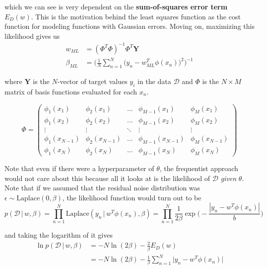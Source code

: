   which we can see is very dependent on the \textbf{sum-of-squares error term} $E_D(w)$. This is the motivation behind the least squares function as the cost function for modeling functions with Gaussian errors. Moving on, maximizing this likelihood gives us
  \begin{align*}
    w_{ML} & = (\Phi^T \Phi)^{-1} \Phi^T \mathbf{Y} \\
    \beta_{ML} & = \Bigg( \frac{1}{N} \sum_{n=1}^N \big( y_n - w_{ML}^T \phi(x_n)\big)^2 \Bigg)^{-1}
  \end{align*}

  where $\mathbf{Y}$ is the $N$-vector of target values $y_i$ in the data $\mathcal{D}$ and $\Phi$ is the $N \times M$ matrix of basis functions evaluated for each $x_n$.

  \begin{equation}
    \Phi = \begin{pmatrix}
      \phi_1 (x_1) & \phi_2 (x_1) & \ldots & \phi_{M-1} (x_1) & \phi_M (x_1) \\
      \phi_1 (x_2) & \phi_2 (x_2) & \ldots & \phi_{M-1} (x_2) & \phi_M (x_2) \\
      \vdots & \vdots & \ddots & \vdots & \vdots \\
      \phi_1 (x_{N-1}) & \phi_2 (x_{N-1}) & \ldots & \phi_{M-1} (x_{N-1}) & \phi_M (x_{N-1}) \\
      \phi_1 (x_N) & \phi_2 (x_N) & \ldots & \phi_{M-1} (x_N) & \phi_M (x_N)
    \end{pmatrix}
  \end{equation}

  Note that even if there were a hyperparameter of $\theta$, the frequentist approach would not care about this because all it looks at is the likelihood of $\mathcal{D}$ \textit{given} $\theta$. Note that if we assumed that the residual noise distribution was $\epsilon \sim \text{Laplace}(0, \beta)$, the likelihood function would turn out to be
  \begin{equation}
    p(\mathcal{D}\,|\,w, \beta) = \prod_{n=1}^N \text{Laplace}(y_n\,|\,w^T \phi(x_n), \beta) = \prod_{n=1}^N \frac{1}{2\beta} \exp\bigg(- \frac{|y_n - w^T \phi(x_n)|}{b} \bigg)
  \end{equation}

  and taking the logarithm of it gives
  \begin{align*}
    \ln p( \mathcal{D}\,|\, w, \beta) & = -N \ln{(2\beta)} - \frac{2}{\beta} E_D (w) \\
    & = -N \ln{(2\beta)} - \frac{1}{\beta} \sum_{n=1}^N \big| y_n - w^T \phi(x_n) \big|
  \end{align*}

